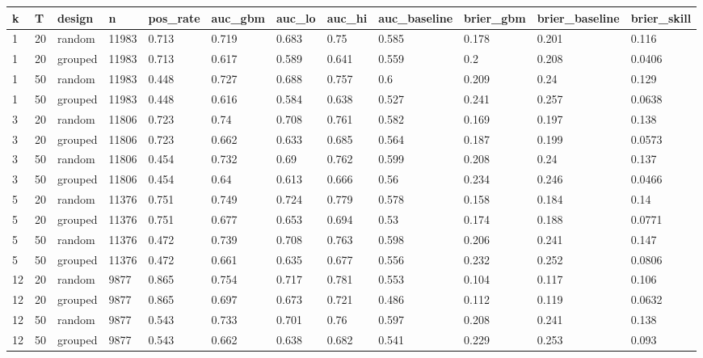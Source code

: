 \begin{tabular}{llllllllllll}
\toprule
k & T & design & n & pos\_rate & auc\_gbm & auc\_lo & auc\_hi & auc\_baseline & brier\_gbm & brier\_baseline & brier\_skill \\
\midrule
1 & 20 & random & 11983 & 0.713 & 0.719 & 0.683 & 0.75 & 0.585 & 0.178 & 0.201 & 0.116 \\
1 & 20 & grouped & 11983 & 0.713 & 0.617 & 0.589 & 0.641 & 0.559 & 0.2 & 0.208 & 0.0406 \\
1 & 50 & random & 11983 & 0.448 & 0.727 & 0.688 & 0.757 & 0.6 & 0.209 & 0.24 & 0.129 \\
1 & 50 & grouped & 11983 & 0.448 & 0.616 & 0.584 & 0.638 & 0.527 & 0.241 & 0.257 & 0.0638 \\
3 & 20 & random & 11806 & 0.723 & 0.74 & 0.708 & 0.761 & 0.582 & 0.169 & 0.197 & 0.138 \\
3 & 20 & grouped & 11806 & 0.723 & 0.662 & 0.633 & 0.685 & 0.564 & 0.187 & 0.199 & 0.0573 \\
3 & 50 & random & 11806 & 0.454 & 0.732 & 0.69 & 0.762 & 0.599 & 0.208 & 0.24 & 0.137 \\
3 & 50 & grouped & 11806 & 0.454 & 0.64 & 0.613 & 0.666 & 0.56 & 0.234 & 0.246 & 0.0466 \\
5 & 20 & random & 11376 & 0.751 & 0.749 & 0.724 & 0.779 & 0.578 & 0.158 & 0.184 & 0.14 \\
5 & 20 & grouped & 11376 & 0.751 & 0.677 & 0.653 & 0.694 & 0.53 & 0.174 & 0.188 & 0.0771 \\
5 & 50 & random & 11376 & 0.472 & 0.739 & 0.708 & 0.763 & 0.598 & 0.206 & 0.241 & 0.147 \\
5 & 50 & grouped & 11376 & 0.472 & 0.661 & 0.635 & 0.677 & 0.556 & 0.232 & 0.252 & 0.0806 \\
12 & 20 & random & 9877 & 0.865 & 0.754 & 0.717 & 0.781 & 0.553 & 0.104 & 0.117 & 0.106 \\
12 & 20 & grouped & 9877 & 0.865 & 0.697 & 0.673 & 0.721 & 0.486 & 0.112 & 0.119 & 0.0632 \\
12 & 50 & random & 9877 & 0.543 & 0.733 & 0.701 & 0.76 & 0.597 & 0.208 & 0.241 & 0.138 \\
12 & 50 & grouped & 9877 & 0.543 & 0.662 & 0.638 & 0.682 & 0.541 & 0.229 & 0.253 & 0.093 \\
\bottomrule
\end{tabular}